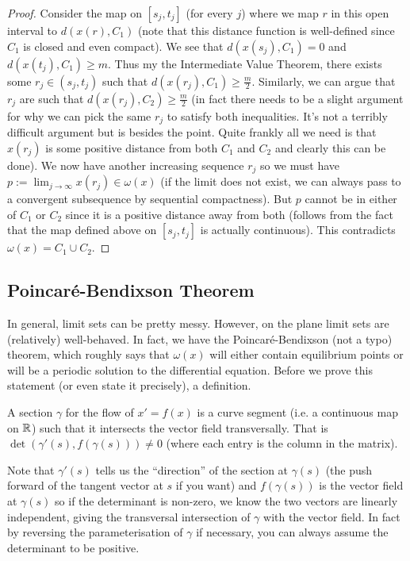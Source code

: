 \begin{proof}
Consider the map on $[s_j, t_j]$ (for every $j$) where we map $r$ in this open interval to $d(x(r), C_1)$ (note that this distance function is well-defined since $C_1$ is closed and even compact). We see that $d(x(s_j), C_1) = 0$ and $d(x(t_j), C_1) \geq m$. Thus my the Intermediate Value Theorem, there exists some $r_j \in (s_j, t_j)$ such that $d(x(r_j), C_1) \geq \frac{m}{2}$. Similarly, we can argue that $r_j$ are such that $d(x(r_j), C_2) \geq \frac{m}{2}$ (in fact there needs to be a slight argument for why we can pick the same $r_j$ to satisfy both inequalities. It's not a terribly difficult argument but is besides the point. Quite frankly all we need is that $x(r_j)$ is some positive distance from both $C_1$ and $C_2$ and clearly this can be done). We now have another increasing sequence $r_j$ so we must have $p := \lim_{j \to \infty} x(r_j) \in \omega(x)$ (if the limit does not exist, we can always pass to a convergent subsequence by sequential compactness). But $p$ cannot be in either of $C_1$ or $C_2$ since it is a positive distance away from both (follows from the fact that the map defined above on $[s_j, t_j]$ is actually continuous). This contradicts $\omega(x) = C_1 \cup C_2$.
\end{proof}

\subsection{Poincaré-Bendixson Theorem}

In general, limit sets can be pretty messy. However, on the plane limit sets are (relatively) well-behaved. In fact, we have the Poincaré-Bendixson (not a typo) theorem, which roughly says that $\omega(x)$ will either contain equilibrium points or will be a periodic solution to the differential equation. Before we prove this statement (or even state it precisely), a definition.

\begin{definition}
A section $\gamma$ for the flow of $x' = f(x)$ is a curve segment (i.e. a continuous map on $\mathbb{R}$) such that it intersects the vector field transversally. That is $\det(\gamma'(s), f(\gamma(s))) \neq 0$ (where each entry is the column in the matrix).
\end{definition}
Note that $\gamma'(s)$ tells us the ``direction'' of the section at $\gamma(s)$ (the push forward of the tangent vector at $s$ if you want) and $f(\gamma(s))$ is the vector field at $\gamma(s)$ so if the determinant is non-zero, we know the two vectors are linearly independent, giving the transversal intersection of $\gamma$ with the vector field. In fact by reversing the parameterisation of $\gamma$ if necessary, you can always assume the determinant to be positive.

